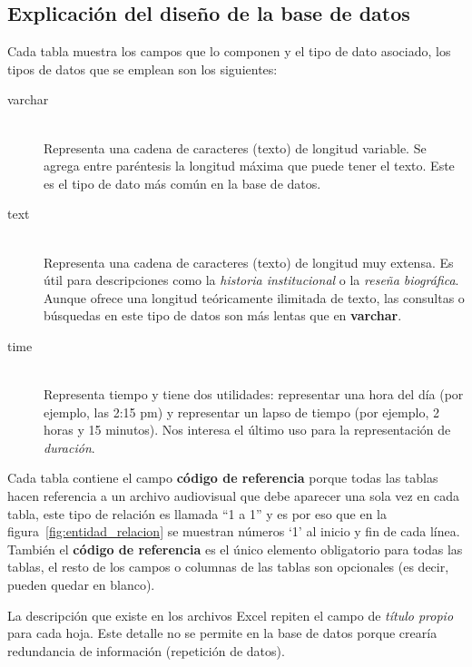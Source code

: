 \documentclass[10pt,letterpaper]{article}
\begin{document}
\subsection{Explicación del diseño de la base de datos}
Cada tabla muestra los campos que lo componen y el tipo de dato asociado, los tipos de datos que se emplean son los siguientes:
\begin{description}
	\item[varchar] \hfill \\
		Representa una cadena de caracteres (texto) de longitud variable. Se agrega entre paréntesis la longitud máxima que puede tener el texto. Este es el tipo de dato más común en la base de datos.

	\item[text] \hfill \\
		Representa una cadena de caracteres (texto) de longitud muy extensa. Es útil para descripciones como la \textit{historia institucional} o la \textit{reseña biográfica}. Aunque ofrece una longitud teóricamente ilimitada de texto, las consultas o búsquedas en este tipo de datos son más lentas que en \textbf{varchar}.
	\item[time] \hfill \\
		Representa tiempo y tiene dos utilidades: representar una hora del día (por ejemplo, las 2:15 pm) y representar un lapso de tiempo (por ejemplo, 2 horas y 15 minutos). Nos interesa el último uso para la representación de \textit{duración}.
\end{description}

Cada tabla contiene el campo \textbf{código de referencia} porque todas las tablas hacen referencia a un archivo audiovisual que debe aparecer una sola vez en cada tabla, este tipo de relación es llamada ``1 a 1'' y es por eso que en la figura~\ref{fig:entidad_relacion} se muestran números `1' al inicio y fin de cada línea.
También el \textbf{código de referencia} es el único elemento obligatorio para todas las tablas, el resto de los campos o columnas de las tablas son opcionales (es decir, pueden quedar en blanco).

La descripción que existe en los archivos Excel repiten el campo de \textit{título propio} para cada hoja. Este detalle no se permite en la base de datos porque crearía redundancia de información (repetición de datos).
\end{document}
